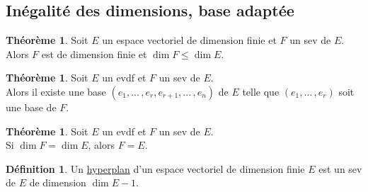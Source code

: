 \documentclass[10pt,a4paper]{article}
\theoremstyle{definition}
\newtheorem{theorem}[proposition]{Théorème}
\newtheorem{definition}[proposition]{Définition}
\begin{document}
\subsection{Inégalité des dimensions, base adaptée}
\begin{theorem}
Soit $E$ un espace vectoriel de dimension finie et $F$ un sev de $E$. \\
Alors $F$ est de dimension finie et $\dim F \leq \dim E$.
\end{theorem}
\begin{theorem}
Soit $E$ un evdf et $F$ un sev de $E$. \\
Alors il existe une base $(e_1, ...\, , e_r, e_{r + 1}, ...\, , e_n)$ de $E$ telle que $(e_1, ...\, , e_r)$ soit une base de $F$.
\end{theorem}
\begin{theorem}
Soit $E$ un evdf et $F$ un sev de $E$. \\
Si $\dim F = \dim E$, alors $F = E$.
\end{theorem}
\begin{definition}
Un \uline{hyperplan} d'un espace vectoriel de dimension finie $E$ est un sev de $E$ de dimension $\dim \left. E - 1 \right.$.
\end{definition}
\end{document}

